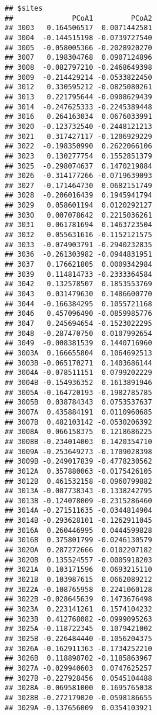 \documentclass[
]{article}
\begin{document}
\begin{verbatim}
## $sites
##              PCoA1         PCoA2
## 3003   0.164506517  0.0071442581
## 3004  -0.144515198 -0.0739727540
## 3005  -0.058005366 -0.2028920270
## 3007   0.198304768  0.0907124896
## 3008  -0.082797210 -0.2468649398
## 3009  -0.214429214 -0.0533822450
## 3012   0.330595212 -0.0825080261
## 3013   0.221795644 -0.0908629439
## 3014  -0.247625333 -0.2245389448
## 3016   0.264163034  0.0676033991
## 3020  -0.123732540 -0.2448121213
## 3021   0.317427117 -0.1206929229
## 3022  -0.198350990  0.2622066106
## 3023   0.130277754  0.1552851379
## 3025  -0.298074637  0.1470219884
## 3026  -0.314177266 -0.0719639093
## 3027  -0.171464730  0.0682151749
## 3028  -0.206016439  0.1945941794
## 3029   0.058601194  0.0120292127
## 3030   0.007078642  0.2215036261
## 3031   0.061781694  0.1463723504
## 3032   0.055631616 -0.1152121575
## 3033  -0.074903791 -0.2940232835
## 3036  -0.261303982 -0.0944831951
## 3037   0.176621805  0.0009342984
## 3039   0.114814733 -0.2333364584
## 3042   0.132578507  0.1853553769
## 3043   0.031479630  0.1486600770
## 3044  -0.166384295  0.1055721168
## 3046   0.457096490 -0.0859985776
## 3047   0.245694654 -0.1523022295
## 3048  -0.287470750  0.0107992654
## 3049  -0.008381539  0.1440716960
## 3003A  0.166655804  0.1064692513
## 3003B -0.065170271  0.1403686144
## 3004A -0.078511151  0.0799202229
## 3004B -0.154936352  0.1613891946
## 3005A -0.164720193 -0.1982785785
## 3005B  0.038784343  0.0753537637
## 3007A  0.435884191  0.0110960685
## 3007B  0.482103142 -0.0530206392
## 3008A  0.066158375  0.1218686225
## 3008B -0.234014003  0.1420354710
## 3009A -0.253649273 -0.1709028398
## 3009B -0.249017839 -0.4778230562
## 3012A  0.357880063 -0.0175426105
## 3012B  0.461532158 -0.0960799882
## 3013A -0.087738343 -0.1338242795
## 3013B -0.124078009 -0.2315286460
## 3014A -0.271511635 -0.0344814904
## 3014B -0.293628101 -0.1262911045
## 3016A  0.260446995  0.0444599828
## 3016B  0.375801799 -0.0246130579
## 3020A  0.287272666  0.0102207182
## 3020B  0.135524557 -0.0005918203
## 3021A  0.103171596  0.0693215110
## 3021B  0.103987615  0.0662089212
## 3022A -0.108765958  0.2241060128
## 3022B -0.028645639  0.1473676498
## 3023A  0.223141261  0.1574104232
## 3023B  0.412768082 -0.0999095263
## 3025A -0.118722345  0.1079421002
## 3025B -0.226484440 -0.1056204375
## 3026A -0.162911363 -0.1734252210
## 3026B  0.118898702 -0.1185863967
## 3027A -0.029940603  0.0747625257
## 3027B -0.227928456  0.0545104488
## 3028A -0.069581000  0.1695765038
## 3028B -0.272179020 -0.0598186655
## 3029A -0.137656009  0.0354103921

\end{verbatim}
\end{document}
